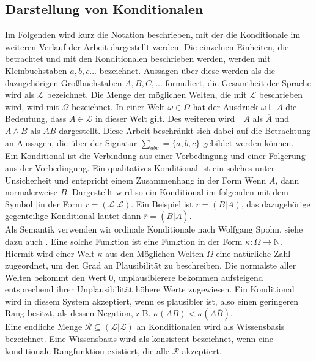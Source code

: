 \documentclass[12pt,a4paper]{article}
\newcommand{\lag}{\mathcal{L}}
\begin{document}
\subsection{Darstellung von Konditionalen}
Im Folgenden wird kurz die Notation beschrieben, mit der die Konditionale im weiteren Verlauf der Arbeit dargestellt werden. Die einzelnen Einheiten, die betrachtet und mit den Konditionalen beschrieben werden, werden mit Kleinbuchstaben $a, b, c ...$ bezeichnet. Aussagen über diese werden als die dazugehörigen Großbuchstaben $A, B, C, ...$ formuliert, die Gesamtheit der Sprache wird als $\lag$ bezeichnet. Die Menge der möglichen Welten, die mit $\lag$ beschrieben wird, wird mit $\Omega$ bezeichnet. In einer Welt $\omega \in \Omega$  hat der Ausdruck $\omega \models A$ die Bedeutung, dass $A \in \lag$ in dieser Welt gilt. Des weiteren wird $\neg A$ als $\overline{A}$ und $A \wedge B$ als $AB$ dargestellt. Diese Arbeit beschränkt sich dabei auf die Betrachtung an Aussagen, die über der Signatur $\sum_{abc} = \{a, b, c\}$ gebildet werden können. \\
Ein Konditional ist die Verbindung aus einer Vorbedingung und einer Folgerung aus der Vorbedingung. Ein qualitatives Konditional ist ein solches unter  Unsicherheit und entspricht einem Zusammenhang in der Form \glqq Wenn $A$, dann normalerweise $B$\grqq . Dargestellt wird so ein Konditional  im folgenden mit dem Symbol \glqq$|$\grqq \space in der Form $r = ( \lag | \lag)$. Ein Beispiel ist $r = (B|A)$, das dazugehörige gegenteilige Konditional lautet dann $\overline{r} = (\overline{B}|A)$.\\
Als Semantik verwenden wir ordinale Konditionale nach Wolfgang Spohn, siehe dazu auch \cite{spohn12}. Eine solche Funktion ist eine Funktion in der Form $\kappa :  \Omega \rightarrow \mathbb{N} $. Hiermit wird einer Welt $\kappa$ aus den Möglichen Welten $\Omega$ eine natürliche Zahl zugeordnet, um den Grad an Plausibilität zu beschreiben. Die normalste aller Welten bekommt den Wert 0, unplausiblerere bekommen aufsteigend entsprechend ihrer Unplausibilität höhere Werte zugewiesen. Ein Konditional wird in diesem System akzeptiert, wenn es plausibler ist, also einen geringeren Rang besitzt, als dessen Negation, z.B. $\kappa(AB)<\kappa(A\overline{B})$. \\
Eine endliche Menge $\mathcal{R} \subseteq (\lag | \lag)$ an Konditionalen wird als Wissensbasis bezeichnet. Eine Wissensbasis wird als konsistent bezeichnet, wenn eine konditionale Rangfunktion existiert, die alle $\mathcal{R}$ akzeptiert.
\end{document}
